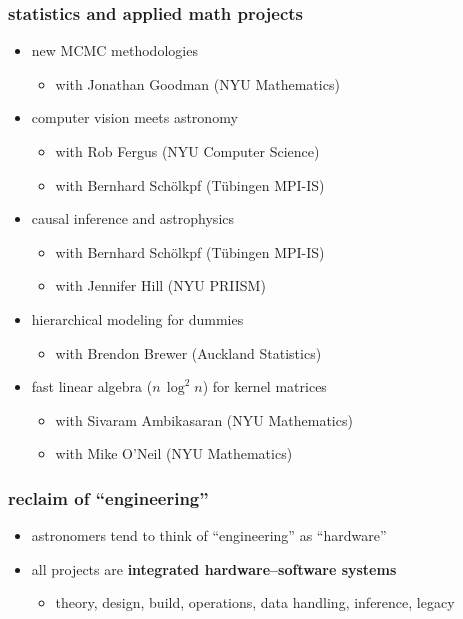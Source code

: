 \documentclass{beamer}
\renewcommand{\emph}[1]{\textbf{#1}}
\begin{document}
\begin{frame}
  \frametitle{statistics and applied math projects}
  \begin{itemize}
  \item new MCMC methodologies
    \begin{itemize}
    \item with Jonathan Goodman (NYU Mathematics)
    \end{itemize}
  \item computer vision meets astronomy
    \begin{itemize}
    \item with Rob Fergus (NYU Computer Science)
    \item with Bernhard Sch\"olkpf (T\"ubingen MPI-IS)
    \end{itemize}
  \item causal inference and astrophysics
    \begin{itemize}
    \item with Bernhard Sch\"olkpf (T\"ubingen MPI-IS)
    \item with Jennifer Hill (NYU PRIISM)
    \end{itemize}
  \item hierarchical modeling for dummies
    \begin{itemize}
    \item with Brendon Brewer (Auckland Statistics)
    \end{itemize}
  \item fast linear algebra ($n\,\log^2n$) for kernel matrices
    \begin{itemize}
    \item with Sivaram Ambikasaran (NYU Mathematics)
    \item with Mike O'Neil (NYU Mathematics)
    \end{itemize}
  \end{itemize}
\end{frame}

\begin{frame}
  \frametitle{reclaim of ``engineering''}
  \begin{itemize}
  \item astronomers tend to think of ``engineering'' as ``hardware''
  \item all projects are \emph{integrated hardware--software systems}
    \begin{itemize}
    \item theory, design, build, operations, data handling, inference, legacy
    \end{itemize}
  \end{itemize}
\end{frame}
\end{document}

